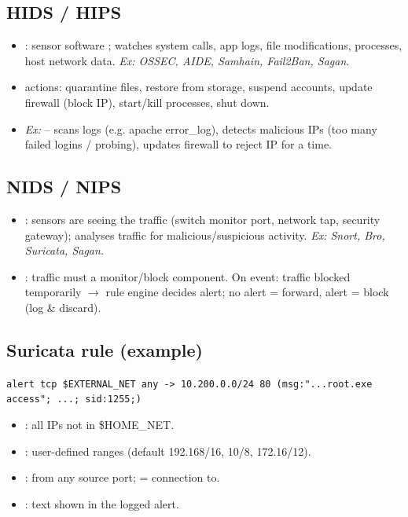 \subsection{HIDS / HIPS}
\begin{itemize}
\item {}: sensor software ; watches system calls, app logs, file modifications, processes, host network data. \textit{Ex: OSSEC, AIDE, Samhain, Fail2Ban, Sagan.}
\item {} actions: quarantine files, restore from storage, suspend accounts, update firewall (block IP), start/kill processes, shut down.
\item \textit{Ex: } -- scans logs (e.g. apache error\_log), detects malicious IPs (too many failed logins / probing), updates firewall to reject IP for a time.
\end{itemize}

\subsection{NIDS / NIPS}
\begin{itemize}
\item {}: sensors are  seeing the traffic (switch monitor port, network tap, security gateway); analyses traffic for malicious/suspicious activity. \textit{Ex: Snort, Bro, Suricata, Sagan.}
\item {}: traffic must  a monitor/block component. On event: traffic blocked temporarily $\to$ rule engine decides alert; no alert = forward, alert = block (log \& discard).
\end{itemize}

\subsection{Suricata rule (example)}
{\scriptsize\texttt{alert tcp \$EXTERNAL\_NET any -> 10.200.0.0/24 80 (msg:"...root.exe access"; ...; sid:1255;)}}
\begin{itemize}
\item {}: all IPs not in \$HOME\_NET.
\item {}: user-defined ranges (default 192.168/16, 10/8, 172.16/12).
\item {}: from any source port; \kw{->} = connection to.
\item {}: text shown in the logged alert.
\end{itemize}

